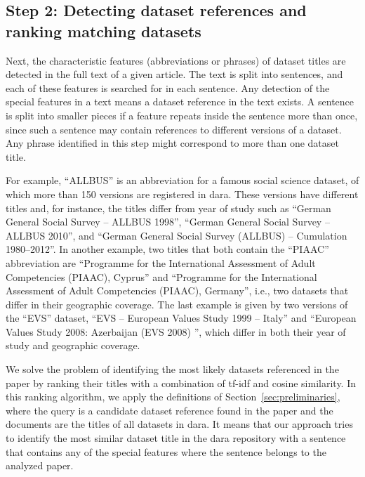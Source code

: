 \documentclass{IOS-Book-Article}
\newcommand{\dara}{\textsf{da\textbar ra}}
\begin{document}
\subsection{Step 2: Detecting dataset references and ranking matching datasets}
\label{sec:detecting-ranking}
Next, the characteristic features (abbreviations or phrases) of dataset titles are detected in the full text of a given article.
The text is split into sentences, and each of these features is searched for in each sentence. 
Any detection of the special features in a text means a dataset reference in the text exists.
A sentence is split into smaller pieces if a feature repeats inside the sentence more than once, since such a sentence may contain references to %
different versions of a dataset.
Any phrase identified in this step might correspond to more than one dataset title.

For example, \enquote{ALLBUS} is an abbreviation for a famous social science dataset, of which more than 150 versions are registered in {\dara}.
These versions have different titles and, for instance, the titles differ from year of study such as \enquote{German General
Social Survey -- ALLBUS 1998}, 
\enquote{German General Social Survey -- ALLBUS 2010}, and \enquote{German General Social Survey (ALLBUS) -- Cumulation 1980--2012}.
In another example, two titles that both contain the \enquote{PIAAC} abbreviation are \enquote{Programme for the International Assessment of Adult Competencies (PIAAC), Cyprus} and \enquote{Programme for the International Assessment of Adult Competencies (PIAAC), Germany}, i.e., two datasets that differ in their geographic coverage.
The last example is given by two versions of the \enquote{EVS} dataset, 
\enquote{EVS -- European Values Study 1999 -- Italy} and \enquote{European Values Study 2008: Azerbaijan (EVS 2008) }, which differ in both their year of study and geographic coverage.

We solve the problem of identifying the most likely datasets referenced in the paper by ranking their titles with a combination of tf-idf and cosine similarity.
In this ranking algorithm, we apply the definitions of Section~\ref{sec:preliminaries}, where the query is a candidate dataset reference found in the paper and the documents are the titles of all datasets in {\dara}. 
It means that our approach tries to identify the most similar dataset title in the {\dara} repository with a sentence that contains any of the special features where the sentence belongs to the analyzed paper.
\end{document}
